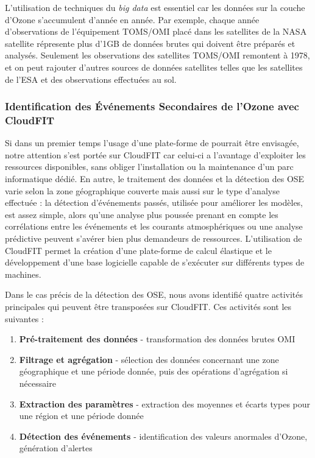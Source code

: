 L'utilisation de techniques du \textit{big data} est essentiel car les données sur la couche d'Ozone s'accumulent d'année en année. Par exemple, chaque année d'observations de l'équipement TOMS/OMI placé dans les satellites de la NASA satellite répresente plus d'1GB de données brutes qui doivent être préparés et analysés. Seulement les observations des satellites TOMS/OMI remontent à 1978, et on peut rajouter d'autres sources de données satellites telles que les satellites de l'ESA et des observations effectuées au sol. 

\subsubsection{Identification des Événements Secondaires de l'Ozone avec CloudFIT\label{sec:development}}

Si dans un premier temps l'usage d'une plate-forme de pourrait être envisagée, notre attention s'est portée sur CloudFIT car celui-ci a l'avantage d'exploiter les ressources disponibles, sans obliger l'installation ou la maintenance d'un parc informatique dédié. En autre, le traitement des données et la détection des OSE varie selon la zone géographique couverte mais aussi sur le type d'analyse effectuée : la détection d'événements passés, utilisée pour améliorer les modèles, est assez simple, alors qu'une analyse plus poussée prenant en compte les corrélations entre les événements et les courants atmosphériques ou une analyse prédictive peuvent s'avérer bien plus demandeurs de ressources. L'utilisation de CloudFIT permet la création d'une plate-forme de calcul élastique et le développement d'une base logicielle capable de s'exécuter sur différents types de machines.

Dans le cas précis de la détection des OSE, nous avons identifié quatre activités principales qui peuvent être transposées sur CloudFIT. Ces activités sont les suivantes : 
\begin{enumerate}
	\item \textbf{Pré-traitement des données} - transformation des données brutes OMI
	\item \textbf{Filtrage et agrégation} - sélection des données concernant une zone géographique et une période donnée, puis des opérations d'agrégation si nécessaire
	\item \textbf{Extraction des paramètres} - extraction des moyennes et écarts types pour une région et une période donnée
	\item \textbf{Détection des événements} - identification des valeurs anormales d'Ozone, génération d'alertes
\end{enumerate}

